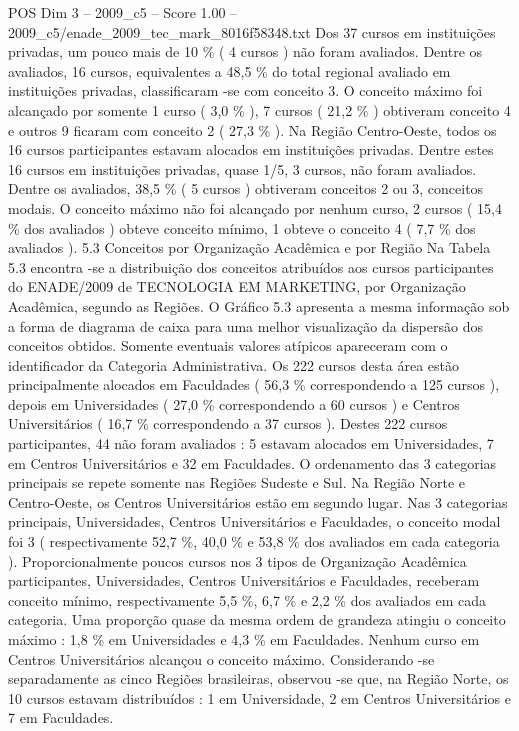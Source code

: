 \begin{textsample}{POS Dim 3 – 2009\_c5 – Score 1.00 – 2009\_c5/enade\_2009\_tec\_mark\_8016f58348.txt}
Dos 37 cursos em instituições privadas, um pouco mais de 10 \% ( 4 cursos ) não foram avaliados.
Dentre os avaliados, 16 cursos, equivalentes a 48,5 \% do total regional avaliado em instituições privadas, classificaram -se com conceito 3.
O conceito máximo foi alcançado por somente 1 curso ( 3,0 \% ), 7 cursos ( 21,2 \% ) obtiveram conceito 4 e outros 9 ficaram com conceito 2 ( 27,3 \% ).
Na Região Centro-Oeste, todos os 16 cursos participantes estavam alocados em instituições privadas.
Dentre estes 16 cursos em instituições privadas, quase 1/5, 3 cursos, não foram avaliados.
Dentre os avaliados, 38,5 \% ( 5 cursos ) obtiveram conceitos 2 ou 3, conceitos modais.
O conceito máximo não foi alcançado por nenhum curso, 2 cursos ( 15,4 \% dos avaliados ) obteve conceito mínimo, 1 obteve o conceito 4 ( 7,7 \% dos avaliados ). 5.3 Conceitos por Organização Acadêmica e por Região Na Tabela 5.3 encontra -se a distribuição dos conceitos atribuídos aos cursos participantes do ENADE/2009 de TECNOLOGIA EM MARKETING, por Organização Acadêmica, segundo as Regiões.
O Gráfico 5.3 apresenta a mesma informação sob a forma de diagrama de caixa para uma melhor visualização da dispersão dos conceitos obtidos.
Somente eventuais valores atípicos apareceram com o identificador da Categoria Administrativa.
Os 222 cursos desta área estão principalmente alocados em Faculdades ( 56,3 \% correspondendo a 125 cursos ), depois em Universidades ( 27,0 \% correspondendo a 60 cursos ) e Centros Universitários ( 16,7 \% correspondendo a 37 cursos ).
Destes 222 cursos participantes, 44 não foram avaliados : 5 estavam alocados em Universidades, 7 em Centros Universitários e 32 em Faculdades.
O ordenamento das 3 categorias principais se repete somente nas Regiões Sudeste e Sul.
Na Região Norte e Centro-Oeste, os Centros Universitários estão em segundo lugar.
Nas 3 categorias principais, Universidades, Centros Universitários e Faculdades, o conceito modal foi 3 ( respectivamente 52,7 \%, 40,0 \% e 53,8 \% dos avaliados em cada categoria ).
Proporcionalmente poucos cursos nos 3 tipos de Organização Acadêmica participantes, Universidades, Centros Universitários e Faculdades, receberam conceito mínimo, respectivamente 5,5 \%, 6,7 \% e 2,2 \% dos avaliados em cada categoria.
Uma proporção quase da mesma ordem de grandeza atingiu o conceito máximo : 1,8 \% em Universidades e 4,3 \% em Faculdades.
Nenhum curso em Centros Universitários alcançou o conceito máximo.
Considerando -se separadamente as cinco Regiões brasileiras, observou -se que, na Região Norte, os 10 cursos estavam distribuídos : 1 em Universidade, 2 em Centros Universitários e 7 em Faculdades.

\end{textsample}
